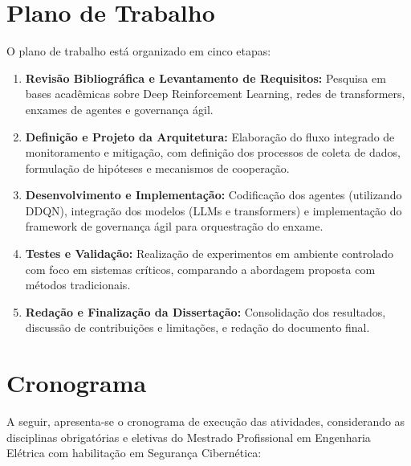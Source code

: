 \documentclass[article,12pt,a4paper]{abntex2}
\begin{document}
\section{Plano de Trabalho}
O plano de trabalho está organizado em cinco etapas:
\begin{enumerate}
    \item \textbf{Revisão Bibliográfica e Levantamento de Requisitos:} Pesquisa em bases acadêmicas sobre Deep Reinforcement Learning, redes de transformers, enxames de agentes e governança ágil.
    \item \textbf{Definição e Projeto da Arquitetura:} Elaboração do fluxo integrado de monitoramento e mitigação, com definição dos processos de coleta de dados, formulação de hipóteses e mecanismos de cooperação.
    \item \textbf{Desenvolvimento e Implementação:} Codificação dos agentes (utilizando DDQN), integração dos modelos (LLMs e transformers) e implementação do framework de governança ágil para orquestração do enxame.
    \item \textbf{Testes e Validação:} Realização de experimentos em ambiente controlado com foco em sistemas críticos, comparando a abordagem proposta com métodos tradicionais.
    \item \textbf{Redação e Finalização da Dissertação:} Consolidação dos resultados, discussão de contribuições e limitações, e redação do documento final.
\end{enumerate}

\section{Cronograma}
A seguir, apresenta-se o cronograma de execução das atividades, considerando as disciplinas obrigatórias e eletivas do Mestrado Profissional em Engenharia Elétrica com habilitação em Segurança Cibernética:
\end{document}
